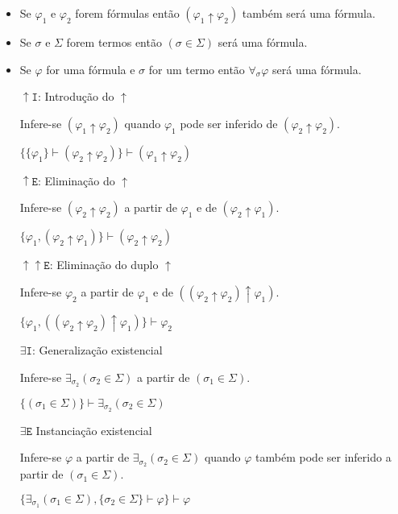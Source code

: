 \begin{itemize}
   \item
      Se $\varphi_1$ e $\varphi_2$ forem fórmulas então
      $(\varphi_1\uparrow\varphi_2)$ também será uma fórmula.
   \item
      Se $\sigma$ e $\Sigma$ forem termos então $(\sigma\in\Sigma)$
      será uma fórmula.
   \item
      Se $\varphi$ for uma fórmula e $\sigma$ for um termo então
      $\forall_{\sigma}\varphi$ será uma fórmula.

   \item[$\uparrow\mathtt I$:] Introdução do $\uparrow$
   
      Infere-se $(\varphi_1\uparrow\varphi_2)$
      quando $\varphi_1$ pode ser inferido de $(\varphi_2\uparrow\varphi_2)$.

      $
         \{\{\varphi_1\} \vdash (\varphi_2\uparrow\varphi_2)\} \vdash
         (\varphi_1\uparrow\varphi_2)
      $

   \item[$\uparrow\mathtt E$:] Eliminação do $\uparrow$
   
      Infere-se $(\varphi_2\uparrow\varphi_2)$
      a partir de $\varphi_1$ e de $(\varphi_2\uparrow\varphi_1)$.

      $
         \{\varphi_1, (\varphi_2\uparrow\varphi_1)\} \vdash
         (\varphi_2\uparrow\varphi_2)
      $

   \item[$\uparrow\uparrow\mathtt E$:] Eliminação do duplo $\uparrow$

      Infere-se $\varphi_2$
      a partir de $\varphi_1$ e de
      $((\varphi_2\uparrow\varphi_2)\uparrow\varphi_1)$.

      $
         \{\varphi_1, ((\varphi_2\uparrow\varphi_2)\uparrow\varphi_1)\}\vdash
         \varphi_2
      $

   \item[$\exists\mathtt I$:] Generalização existencial

      Infere-se $\exists_{\sigma_2} (\sigma_2\in\Sigma)$
      a partir de $(\sigma_1\in\Sigma)$.

      $\{(\sigma_1\in\Sigma)\}\vdash \exists_{\sigma_2} (\sigma_2\in\Sigma)$

      \item[$\exists\mathtt E$] Instanciação existencial

      Infere-se $\varphi$ a partir de $\exists_{\sigma_2} (\sigma_2\in\Sigma)$
      quando $\varphi$ também pode ser inferido a partir de $(\sigma_1\in\Sigma)$.

      $
         \{\exists_{\sigma_1} (\sigma_1\in\Sigma),
         \{\sigma_2\in\Sigma\}\vdash\varphi\}\vdash\varphi
      $
\end{itemize}
